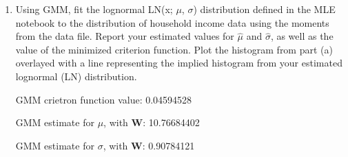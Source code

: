 \documentclass[letterpaper,12pt]{article}
\theoremstyle{definition}
\begin{document}
\begin{enumerate}
\begin{enumerate}
\item Using GMM, fit the lognormal LN(x; $\mu$, $\sigma$) distribution defined in the MLE notebook to the distribution of household income data using the moments from the data file. Report your estimated values for $\hat{\mu}$ and $\hat{\sigma}$, as well as the value of the minimized criterion function. Plot the histogram from part (a) overlayed with a line representing the implied histogram from your estimated lognormal (LN) distribution.
\par
\begin{figure}[H]\centering\captionsetup{width=4.0in}
\end{figure}
\par
GMM crietron function value: 0.04594528 \par
GMM estimate for $\mu$, with $\textbf{W}$: 10.76684402\par
GMM estimate for $\sigma$, with $\textbf{W}$: 0.90784121 \par
\bigskip


\end{enumerate}
\end{enumerate}
\end{document}
